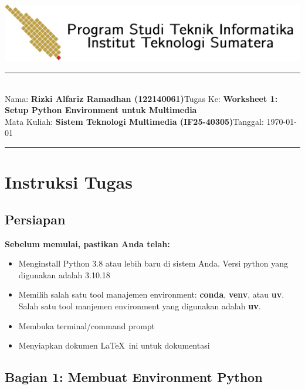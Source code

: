 \documentclass[11pt,a4paper]{article}
\newcommand{\student}{\textbf{Rizki Alfariz Ramadhan (122140061)}}
\newcommand{\course}{\textbf{Sistem Teknologi Multimedia (IF25-40305)}}
\newcommand{\assignment}{\textbf{Worksheet 1: Setup Python Environment untuk Multimedia}}
\begin{document}
\thispagestyle{empty}
\begin{center}
	\includegraphics[scale = 0.15]{Figure/ifitera-header.png}
	\vspace{0.1cm}
\end{center}
\noindent
\rule{17cm}{0.2cm}\\[0.3cm]
Nama: \student \hfill Tugas Ke: \assignment\\[0.1cm]
Mata Kuliah: \course \hfill Tanggal: \today\\
\rule{17cm}{0.05cm}
\vspace{0.1cm}



\section{Instruksi Tugas}

\subsection{Persiapan}
\textbf{Sebelum memulai, pastikan Anda telah:}
\begin{itemize}
    \item Menginstall Python 3.8 atau lebih baru di sistem Anda. Versi python yang digunakan adalah 3.10.18
    \item Memilih salah satu tool manajemen environment: \textbf{conda}, \textbf{venv}, atau \textbf{uv}. Salah satu tool manjemen environment yang digunakan adalah \textbf{uv}.
    \item Membuka terminal/command prompt
    \item Menyiapkan dokumen \LaTeX\ ini untuk dokumentasi
\end{itemize}

\subsection{Bagian 1: Membuat Environment Python}
\end{document}
